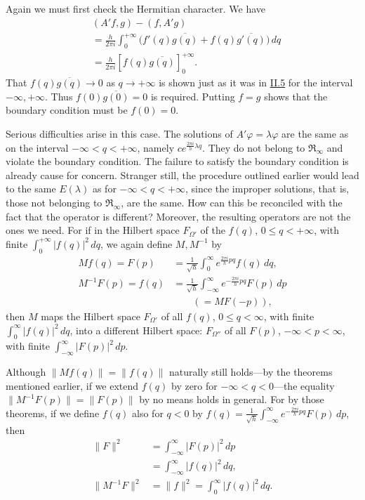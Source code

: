 \documentclass[fontsize=13pt,twoside,openany,headings=normal,parskip=false,bookmarkpackage=false,DIV=calc]{scrbook}
\begin{document}
\hypertarget{origpage-72}{}%
Again we must first check the Hermitian character. We have
\begin{align*}
&(A'f,g)-(f,A'g)\\
&=\frac{h}{2\pi i}\int_0^{+\infty}\bigl(f'(q)\overline{g(q)}+f(q)\overline{g'(q)}\bigr)\,dq\\
&=\frac{h}{2\pi i}[f(q)\overline{g(q)}]_0^{+\infty}.
\end{align*}
That $f(q)\overline{g(q)}\to0$ as $q\to+\infty$ is shown just as it was in \hyperref[sec:II.5]{II.5} for the interval $-\infty,+\infty$. Thus $f(0)\overline{g(0)}=0$ is required. Putting $f=g$ shows that the boundary condition must be $f(0)=0$.

Serious difficulties arise in this case. The solutions of $A'\varphi=\lambda\varphi$ are the same as on the interval $-\infty<q<+\infty$, namely $ce^{\frac{2\pi i}{h}\lambda q}$. They do not belong to $\mathfrak{R}_\infty$ and violate the boundary condition. The failure to satisfy the boundary condition is already cause for concern. Stranger still, the procedure outlined earlier would lead to the same $E(\lambda)$ as for $-\infty<q<+\infty$, since the improper solutions, that is, those not belonging to $\mathfrak{R}_\infty$, are the same. How can this be reconciled with the fact that the operator is different? Moreover, the resulting operators are not the ones we need. For if in the Hilbert space $F_{\Omega'}$ of the $f(q)$, $0\leq q<+\infty$, with finite $\int_0^{+\infty}|f(q)|^2\,dq$, we again define $M,M^{-1}$ by
\begin{align*}
Mf(q)=F(p)&=\frac1{\sqrt h}\int_0^{\infty}e^{\frac{2\pi i}{h}pq}f(q)\,dq,\\
M^{-1}F(p)=f(q)&=\frac1{\sqrt h}\int_{-\infty}^{\infty}e^{-\frac{2\pi i}{h}pq}F(p)\,dp
\\
&\qquad(=MF(-p)),
\end{align*}
then $M$ maps the Hilbert space $F_{\Omega'}$ of all $f(q)$, $0\leq q<\infty$, with finite $\int_0^{\infty}|f(q)|^2\,dq$, into a different Hilbert space: $F_{\Omega''}$ of all $F(p)$, $-\infty<p<\infty$, with finite $\int_{-\infty}^{\infty}|F(p)|^2\,dp$.

Although $\|Mf(q)\|=\|f(q)\|$ naturally still holds---by the theorems mentioned earlier, if we extend $f(q)$ by zero for $-\infty<q<0$---the equality $\|M^{-1}F(p)\|=\|F(p)\|$ by no means holds in general. For by those theorems, if we define $f(q)$ also for $q<0$ by $f(q)=\frac1{\sqrt h}\int_{-\infty}^{\infty}e^{-\frac{2\pi i}{h}pq}F(p)\,dp$, then
\begin{align*}
\|F\|^2&=\int_{-\infty}^{\infty}|F(p)|^2\,dp\\
&=\int_{-\infty}^{\infty}|f(q)|^2\,dq,\\
\|M^{-1}F\|^2&=\|f\|^2=\int_0^{\infty}|f(q)|^2\,dq.
\end{align*}
\end{document}
